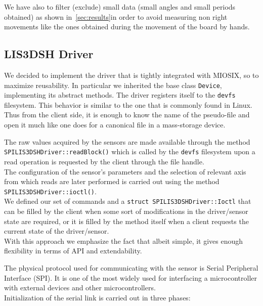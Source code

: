 We have also to filter (exclude) small data (small angles and small periods obtained) as shown in~\ref{sec:results}in order  to avoid measuring non right movements like the ones obtained during the movement of the board by hands.

\subsection{LIS3DSH Driver}
We decided to implement the driver that is tightly integrated with MIOSIX, so to maximize reusability. In particular we inherited the base class \texttt{Device}, implementing its abstract methods. The driver registers itself to the \texttt{devfs} filesystem. This behavior is similar to the one that is commonly found in Linux. Thus from the client side, it is enough to know the name of the pseudo-file and open it much like one does for a canonical file in a mass-storage device.  \par The raw values acquired by the sensors are made available through the method \\ \texttt{SPILIS3DSHDriver::readBlock()} which is called by the \texttt{devfs} filesystem upon a read operation is requested by the client through the file handle. \\
The configuration of the sensor's parameters and the selection of relevant axis from which reads are later performed is carried out using the method \texttt{SPILIS3DSHDriver::ioctl()}. \\ We defined our set of commands and a \texttt{struct SPILIS3DSHDriver::Ioctl} that can be filled by the client when some sort of modifications in the driver/sensor state are required, or it is filled by the method itself when a client requests the current state of the driver/sensor. \\ With this approach we emphasize the fact that albeit simple, it gives enough flexibility in terms of API and extendability.
\par
The physical protocol used for communicating with the sensor is Serial Peripheral Interface \cite{accelerometerDatasheet}\cite{STM32F4RefMan}  (SPI). It is one of the most widely used for interfacing a microcontroller with external devices and other microcontrollers. \\  
Initialization of the serial link is carried out in three phases:
